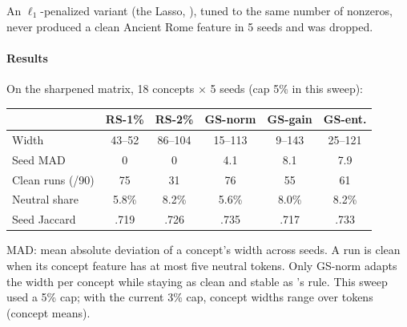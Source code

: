\noindent An $\ell_1$-penalized variant (the Lasso, \citealt{tibshirani1996lasso}), tuned to the same number of nonzeros, never produced a clean Ancient Rome feature in 5 seeds and was dropped.

\paragraph{Results}
On the sharpened matrix, 18 concepts $\times$ 5 seeds (cap 5\% in this sweep):

\begin{center}
\footnotesize
\setlength{\tabcolsep}{2pt}
\begin{tabular}{@{}lccccc@{}}
\toprule
 & RS-1\% & RS-2\% & GS-norm & GS-gain & GS-ent. \\
\midrule
Width & 43--52 & 86--104 & 15--113 & 9--143 & 25--121 \\
Seed MAD & 0 & 0 & 4.1 & 8.1 & 7.9 \\
Clean runs (/90) & 75 & 31 & 76 & 55 & 61 \\
Neutral share & 5.8\% & 8.2\% & 5.6\% & 8.0\% & 8.2\% \\
Seed Jaccard & .719 & .726 & .735 & .717 & .733 \\
\bottomrule
\end{tabular}
\end{center}

\noindent MAD: mean absolute deviation of a concept's width across seeds. A run is clean when its concept feature has at most five neutral tokens.
Only GS-norm adapts the width per concept while staying as clean and stable as \ember{}'s rule.
This sweep used a 5\% cap; with the current 3\% cap, concept widths range over  tokens (concept means).


